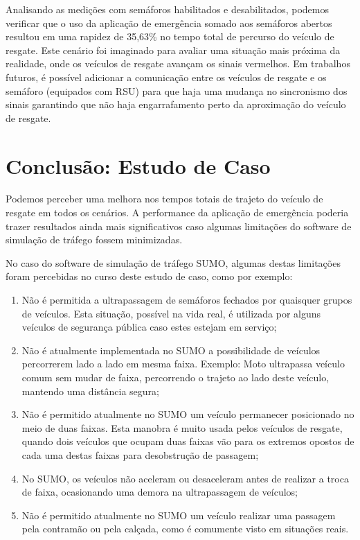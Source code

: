 \documentclass[
12pt,				%
openright,			%
oneside,			%
a4paper,			%
brazil,				%
]{abntex2}
\begin{document}
	\par Analisando as medições com semáforos habilitados e desabilitados, podemos verificar que o uso da aplicação de emergência somado aos semáforos abertos resultou em uma rapidez de 35,63\% no tempo total de percurso do veículo de resgate. Este cenário foi imaginado para avaliar uma situação mais próxima da realidade, onde os veículos de resgate avançam os sinais vermelhos. Em trabalhos futuros, é possível adicionar a comunicação entre os veículos de resgate e os semáforo (equipados com RSU) para que haja uma mudança no sincronismo dos sinais garantindo que não haja engarrafamento perto da aproximação do veículo de resgate.
	
	
	\section{Conclusão: Estudo de Caso}
	
	\par Podemos perceber uma melhora nos tempos totais de trajeto do veículo de resgate em todos os cenários. A performance da aplicação de emergência poderia trazer resultados ainda mais significativos caso algumas limitações do software de simulação de tráfego fossem minimizadas.
	
	\par No caso do software de simulação de tráfego SUMO, algumas destas limitações foram percebidas no curso deste estudo de caso, como por exemplo:
	
	\begin{enumerate}
		\item Não é permitida a ultrapassagem de semáforos fechados por quaisquer grupos de veículos. Esta situação, possível na vida real, é utilizada por alguns veículos de segurança pública caso estes estejam em serviço;
		\item Não é atualmente implementada no SUMO a possibilidade de veículos percorrerem lado a lado em mesma faixa. Exemplo: Moto ultrapassa veículo comum sem mudar de faixa, percorrendo o trajeto ao lado deste veículo, mantendo uma distância segura;
		\item Não é permitido atualmente no SUMO um veículo permanecer posicionado no meio de duas faixas. Esta manobra é muito usada pelos veículos de resgate, quando dois veículos que ocupam duas faixas vão para os extremos opostos de cada uma destas faixas para desobstrução de passagem;
		\item No SUMO, os veículos não aceleram ou desaceleram antes de realizar a troca de faixa, ocasionando uma demora na ultrapassagem de veículos;
		\item Não é permitido atualmente no SUMO um veículo realizar uma passagem pela contramão ou pela calçada, como é comumente visto em situações reais. 
	\end{enumerate}
	
\end{document}
